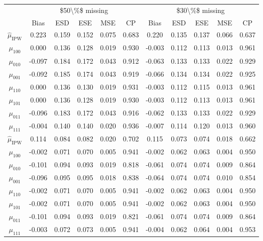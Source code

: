 \documentclass[
]{article}
\begin{document}
\begin{table}[!h]
\centering
\begin{tabular}{ccccccccccc}
\toprule
\multicolumn{1}{c}{} & \multicolumn{5}{c}{\$50\textbackslash{}\%\$ missing} & \multicolumn{5}{c}{\$30\textbackslash{}\%\$ missing} \\
\cmidrule(l{3pt}r{3pt}){2-6} \cmidrule(l{3pt}r{3pt}){7-11}
 & Bias & ESD & ESE & MSE & CP & Bias & ESD & ESE & MSE & CP\\
\midrule
$\hat{\mu}_\text{IPW}$ & 0.223 & 0.159 & 0.152 & 0.075 & 0.683 & 0.220 & 0.135 & 0.137 & 0.066 & 0.637\\
$\hat{\mu}_{100}$ & 0.000 & 0.136 & 0.128 & 0.019 & 0.930 & -0.003 & 0.112 & 0.113 & 0.013 & 0.961\\
$\hat{\mu}_{010}$ & -0.097 & 0.184 & 0.172 & 0.043 & 0.912 & -0.063 & 0.133 & 0.133 & 0.022 & 0.929\\
$\hat{\mu}_{001}$ & -0.092 & 0.185 & 0.174 & 0.043 & 0.919 & -0.066 & 0.134 & 0.134 & 0.022 & 0.925\\
$\hat{\mu}_{110}$ & 0.000 & 0.136 & 0.130 & 0.019 & 0.931 & -0.003 & 0.112 & 0.115 & 0.013 & 0.961\\
$\hat{\mu}_{101}$ & 0.000 & 0.136 & 0.128 & 0.019 & 0.930 & -0.003 & 0.112 & 0.113 & 0.013 & 0.961\\
$\hat{\mu}_{011}$ & -0.096 & 0.183 & 0.172 & 0.043 & 0.916 & -0.062 & 0.133 & 0.133 & 0.022 & 0.929\\
$\hat{\mu}_{111}$ & -0.004 & 0.140 & 0.140 & 0.020 & 0.936 & -0.007 & 0.114 & 0.120 & 0.013 & 0.960\\
$\hat{\mu}_\text{IPW}$ & 0.114 & 0.084 & 0.082 & 0.020 & 0.702 & 0.115 & 0.073 & 0.074 & 0.018 & 0.662\\
$\hat{\mu}_{100}$ & -0.002 & 0.071 & 0.070 & 0.005 & 0.941 & -0.002 & 0.062 & 0.063 & 0.004 & 0.950\\
$\hat{\mu}_{010}$ & -0.101 & 0.094 & 0.093 & 0.019 & 0.818 & -0.061 & 0.074 & 0.074 & 0.009 & 0.864\\
$\hat{\mu}_{001}$ & -0.096 & 0.095 & 0.095 & 0.018 & 0.838 & -0.064 & 0.074 & 0.074 & 0.010 & 0.854\\
$\hat{\mu}_{110}$ & -0.002 & 0.071 & 0.070 & 0.005 & 0.941 & -0.002 & 0.062 & 0.063 & 0.004 & 0.950\\
$\hat{\mu}_{101}$ & -0.002 & 0.071 & 0.070 & 0.005 & 0.941 & -0.002 & 0.062 & 0.063 & 0.004 & 0.950\\
$\hat{\mu}_{011}$ & -0.101 & 0.094 & 0.093 & 0.019 & 0.821 & -0.061 & 0.074 & 0.074 & 0.009 & 0.864\\
$\hat{\mu}_{111}$ & -0.003 & 0.072 & 0.073 & 0.005 & 0.941 & -0.004 & 0.062 & 0.064 & 0.004 & 0.953\\
\bottomrule
\end{tabular}
\end{table}
\end{document}
